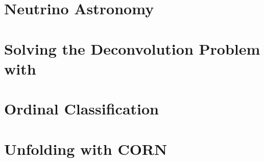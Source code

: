 
\chapter{Neutrino Astronomy} \label{sec:neutrino_astronomy}
  
  
  
\chapter{Solving the Deconvolution Problem with \dseatitle{}} \label{sec:dsea}
  
  
  
\chapter{Ordinal Classification} \label{sec:ordinal}
  
  
  
\chapter{Unfolding with CORN} \label{sec:unfolding}
  
  
  
  
  
  

